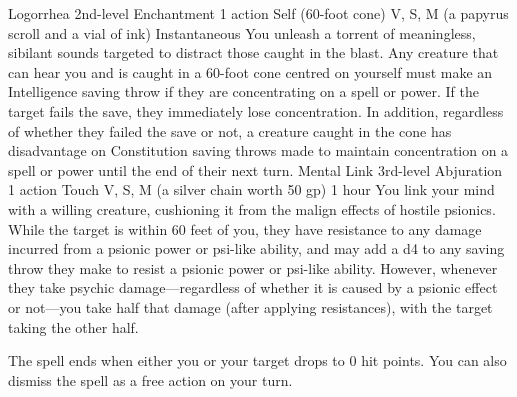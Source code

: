 \DndSpellHeader%
    {Logorrhea\label{spl:logorrhea}}
    {2nd-level Enchantment}
    {1 action}
    {Self (60-foot cone)}
    {V, S, M (a papyrus scroll and a vial of ink)}
    {Instantaneous}
You unleash a torrent of meaningless, sibilant sounds targeted
to distract those caught in the blast.
Any creature that can hear you and is
caught in a 60-foot cone centred on yourself must
make an Intelligence saving throw if they are concentrating on
a spell or power. If the target fails the save,
they immediately lose concentration. In addition,
regardless of whether they failed the save or not, a creature
caught in the cone has disadvantage on
Constitution saving throws made to maintain concentration on
a spell or power until the end of their next turn. %
%
\DndSpellHeader%
    {Mental Link\label{spl:mental-link}}
    {3rd-level Abjuration}
    {1 action}
    {Touch}
    {V, S, M (a silver chain worth 50 gp)}
    {1 hour}
You link your mind with a willing creature, cushioning it from
the malign effects of hostile psionics.
While the target is within 60 feet of you, they have resistance
to any damage incurred from a psionic power
or psi-like ability, and may add a d4 to any saving throw
they make to resist a psionic power or psi-like ability.
However, whenever they take psychic damage---regardless
of whether it is caused by a psionic effect
or not---you take half that damage (after applying resistances),
with the target taking the other half.

The spell ends when either you or your target drops to 0 hit points.
You can also dismiss the spell as a free action on your turn.%
%
